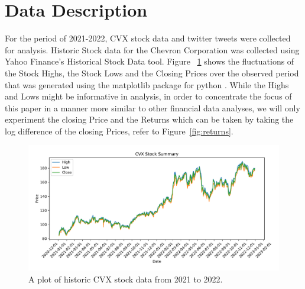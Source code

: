 \documentclass[12pt, letterpaper, titlepage]{article}
\newcommand{\jy}[1]{\textcolor{blue}{JY: #1}}
\begin{document}

\section{Data Description} 
\label{sec:datadesc}


For the period of 2021-2022,  CVX stock data and twitter tweets were collected for analysis.
Historic Stock data for the Chevron Corporation was collected using Yahoo Finance's Historical Stock Data tool. Figure ~\ref{fig:stockdata} shows the fluctuations of the Stock Highs, the Stock Lows and the Closing Prices over the observed period that was generated using the matplotlib package for python \citep{Hunter_2007}. 
While the Highs and Lows might be informative in analysis, in order to concentrate the focus of this paper in a manner more similar to other financial data analyses, we will only experiment the closing Price and the Returns which can be taken by taking the log difference of the closing Prices, refer to Figure~\ref{fig:returns}.
\begin{figure}[tbp]
  \begin{center}
  \includegraphics[width=\textwidth]{../figures/fig1.pdf}
  \caption{A plot of historic CVX stock data from 2021 to 2022.}\label{fig:stockdata}
  \end{center}
\end{figure}
\end{document}
